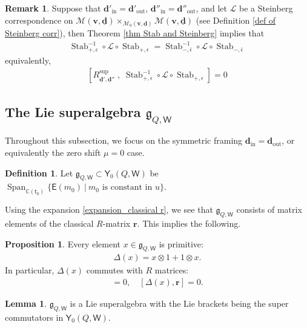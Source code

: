 \documentclass[10pt]{amsart}
\theoremstyle{definition}
\newtheorem{Proposition}[Theorem]{Proposition}
\newtheorem{Lemma}[Theorem]{Lemma}
\newtheorem{Definition}[Theorem]{Definition}
\newtheorem{Remark}[Theorem]{Remark}
\numberwithin{equation}{section}
\newcommand{\bC}{\mathbb{C}}
\newcommand{\bv}{\mathbf{v}}
\newcommand{\bd}{\mathbf{d}}
\newcommand{\cM}{\mathcal{M}}
\newcommand{\sW}{\mathsf{W}}
\newcommand{\Span}{\operatorname{Span}}
\newcommand{\Stab}{\operatorname{Stab}}
\newcommand{\In}{\operatorname{in}}
\newcommand{\Out}{\operatorname{out}}
\begin{document}
\begin{Remark}\label{rmk steinberg comm R}
Suppose that $\bd'_{\In}=\bd'_{\Out}$, $\bd''_{\In}=\bd''_{\Out}$, 
and let $\mathcal L$ be a Steinberg correspondence on $\cM(\bv,\underline{\bd})\times_{\cM_0(\bv,\underline{\bd})} \cM(\bv,\underline{\bd})$ (see Definition \ref{def of Steinberg corr}), then Theorem \ref{thm Stab and Steinberg} implies that
\begin{align*}
\Stab_{+,\epsilon}^{-1}\circ\mathcal L\circ\Stab_{+,\epsilon} = \Stab_{-,\bar\epsilon}^{-1}\circ\mathcal L\circ\Stab_{-,\bar\epsilon}
\end{align*}
equivalently,
\begin{align*}
\left[R^{\mathrm{sup}}_{\underline{\bd}',\underline{\bd}''}\;,\;\Stab_{+,\epsilon}^{-1}\circ\mathcal L\circ\Stab_{+,\epsilon}\right]=0
\end{align*}
\end{Remark}





\subsection{The Lie superalgebra \texorpdfstring{$\mathfrak{g}_{Q,\sW}$}{g(Q,w)}} 

Throughout this subsection, we focus on the symmetric framing $\bd_{\In}=\bd_{\Out}$, or equivalently the zero shift $\mu=0$ case.

\begin{Definition}
Let $\mathfrak{g}_{Q,\sW}\subset \mathsf Y_0(Q,\sW)$ be $\Span_{\bC(\mathsf t_0)}\{\mathsf E(m_0)\:|\: m_0\text{ is constant in }u\}$.
\end{Definition}

Using the expansion \eqref{expansion_classical r}, we see that $\mathfrak{g}_{Q,\sW}$ consists of matrix elements of the classical $R$-matrix $\pmb r$. This implies the following.
\begin{Proposition}
Every element $x\in\mathfrak{g}_{Q,\sW}$ is primitive:
\begin{align*}
    \Delta(x)=x\otimes 1+1\otimes x.
\end{align*}
In particular, $\Delta(x)$ commutes with $R$ matrices:
\begin{align*}
    [\Delta(x),R^{\mathrm{sup}}(u)]=0,\quad [\Delta(x),\pmb r]=0.
\end{align*}
\end{Proposition}

\begin{Lemma}
$\mathfrak{g}_{Q,\sW}$ is a Lie superalgebra with the Lie brackets being the super commutators in $\mathsf Y_0(Q,\sW)$.
\end{Lemma}
\end{document}
